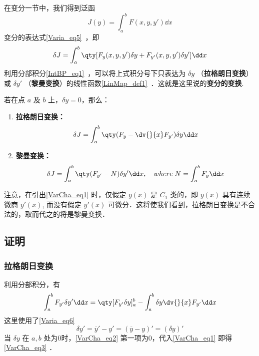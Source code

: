 
在变分一节中，我们得到泛函 
\begin{equation}
J(y)=\int_a^bF(x,y,y')\dd x
\end{equation}
变分的表达式\autoref{Varia_eq5}~，即
\begin{equation}\label{VarCha_eq1}
\delta J=\int_a^b\qty[F_y(x,y,y')\delta y+F_{y'}(x,y,y')\delta y']\dd x
\end{equation}
利用分部积分\autoref{IntBP_eq1}~，可以将上式积分号下只表达为 $\delta y$ （\textbf{拉格朗日变换}）或 $\delta y'$ （\textbf{黎曼变换}）的线性函数\autoref{LinMap_def1}~．这就是这里说的\textbf{变分的变换}.

若在点 $a$ 及 $b$ 上，$\delta y=0$，那么：
\begin{enumerate}
\item \textbf{拉格朗日变换：}
\begin{equation}\label{VarCha_eq3}
\delta J=\int_a^b\qty(F_y-\dv{}{x}F_{y'})\delta y\dd x
\end{equation}
\item \textbf{黎曼变换：}
\begin{equation}\label{VarCha_eq4}
\delta J=\int_a^b\qty(F_{y'}-N)\delta y'\dd x ,\quad where \;N=\int_a^bF_y\dd x
\end{equation}
\end{enumerate}


注意，在引出\autoref{VarCha_eq1} 时，仅假定 $y(x)$ 是 $C_1$ 类的，即 $y(x)$ 具有连续微商 $y'(x)$, 而没有假定 $y'(x)$ 可微分．这将使我们看到，拉格朗日变换是不合法的，取而代之的将是黎曼变换． 

\subsection{证明}
\subsubsection{拉格朗日变换}
利用分部积分，有
\begin{equation}\label{VarCha_eq2}
\int_a^bF_{y'}\delta y'\dd x=\qty[F_{y'}\delta y]_a^b-\int_a^b\delta y\dv{}{x}F_{y'}\dd x
\end{equation}
这里使用了\autoref{Varia_eq6}~
\begin{equation}
\delta y'=\overline{y}'-y'=(\overline{y}-y)'=(\delta y)'
\end{equation}
当 $\delta y$ 在 $a,b$ 处为0时，\autoref{VarCha_eq2} 第一项为0，代入\autoref{VarCha_eq1} 即得\autoref{VarCha_eq3} ．

